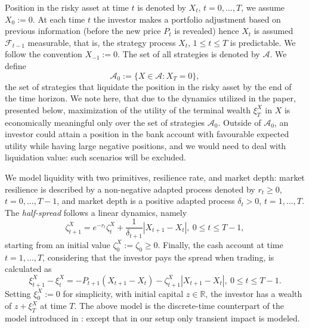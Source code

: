 \documentclass[a4paper]{article}
\begin{document}
Position in the risky asset at time $t$ is denoted by $X_{t}$, $t=0,\ldots,T$, we assume $X_{0}:=0$.
At each time $t$ the investor makes a portfolio adjustment based on previous information (before the new price $P_{t}$
is revealed) hence $X_{t}$ is assumed $\mathcal{F}_{t-1}$ measurable, that is, the strategy process
$X_{t}$, $1\leq t\leq T$ is predictable. We follow the convention $X_{-1}:=0$.
The set of all strategies is denoted by $\mathcal{A}$. We define
$$
\mathcal{A}_{0}:=\{X\in\mathcal{A}:X_{T}=0\},
$$
the set of strategies that liquidate the position in the risky asset by the end of the time horizon.
We note here, that due to the dynamics utilized in the paper, presented below, maximization of the utility of the terminal wealth $\xi_{T}^{X}$ in $X$ is economically meaningful only
over the set of strategies $\mathcal{A}_{0}$. Outside of $\mathcal{A}_0$, an investor could attain a position in the bank account with favourable expected utility while having large negative positions, and we would need to deal with liquidation value: such scenarios will be excluded.


We model liquidity with two primitives, resilience rate, and market depth: market resilience is described by a non-negative adapted process denoted by $r_{t}\geq 0$, $t=0,\ldots,T-1$, and market depth is a positive adapted process $\delta_{t}>0$, $t=1,\ldots,T$. The \emph{half-spread} follows a linear dynamics, namely
\begin{equation}\label{spred}
\zeta^{X}_{t+1}=e^{-r_{t}}\zeta^{X}_{t}+\frac{1}{\delta_{t+1}}|X_{t+1}-X_{t}|,\ 0\leq t\leq T-1,
\end{equation}
starting from an initial value $\zeta_{0}^{X}:=\zeta_{0}\geq 0$.
Finally, the cash account at time $t=1,\ldots,T$, considering that the investor pays the spread when trading, is calculated as
\begin{equation}\label{baccount}
\xi^{X}_{t+1}-\xi_{t}^{X}=-P_{t+1}(X_{t+1}-X_{t})-\zeta^{X}_{t+1}|X_{t+1}-X_{t}|,\ 0\leq t\leq T-1.
\end{equation}
Setting $\xi^{X}_{0}:=0$ for simplicity, with initial capital $z\in\mathbb{R}$, the investor has a wealth of $z+\xi_{T}^{X}$ at time $T$. The above model is the discrete-time counterpart of the model introduced in \cite{peter-yan}: except that in our setup only transient impact is modeled.
\end{document}
